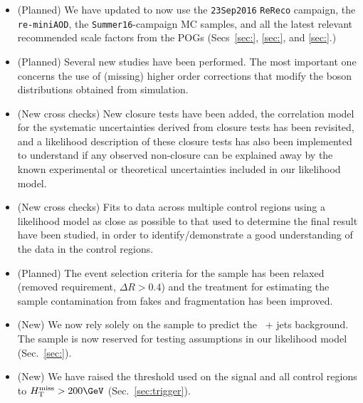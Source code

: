 \begin{itemize}
  
\item (Planned) We have updated to now use the \verb!23Sep2016!
  \verb!ReReco! campaign, the \verb!re-miniAOD!, the
  \verb!Summer16!-campaign MC samples, and all the latest relevant
  recommended scale factors from the POGs (Secs~\ref{sec:},
  \ref{sec:}, and \ref{sec:}.)
    
\item (Planned) Several new studies have been performed. The most
  important one concerns the use of (missing) higher order corrections
  that modify the boson \Pt distributions obtained from simulation.

\item (New cross checks) New closure tests have been added, the
  correlation model for the systematic uncertainties derived from
  closure tests has been revisited, and a likelihood description of
  these closure tests has also been implemented to understand if any
  observed non-closure can be explained away by the known experimental
  or theoretical uncertainties included in our likelihood model.

\item (New cross checks) Fits to data across multiple control regions
  using a likelihood model as close as possible to that used to
  determine the final result have been studied, in order to
  identify/demonstrate a good understanding of the data in the control
  regions.

\item (Planned) The event selection criteria for the \gj sample has
  been relaxed (removed \alphat requirement, $\Delta R > 0.4$) and the
  treatment for estimating the sample contamination from fakes and
  fragmentation has been improved.

\item (New) We now rely solely on the \mmj sample to predict the
  \znunu\ + jets background. The \gj sample is now reserved for
  testing assumptions in our likelihood model (Sec.~\ref{sec:}).
  
\item (New) We have raised the \HTmiss threshold used on the signal
  and all control regions to $\HTmiss > 200\GeV$
  (Sec.~\ref{sec:trigger}).

\end{itemize}

